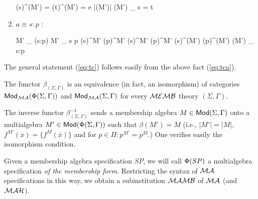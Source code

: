 \documentclass[10pt]{article}
\begin{document}
\begin{PROOF}
\begin{enumerate}
\begin{eqp}
			{\nu}(s)^{\beta(M')} = {\nu}(t)^{\beta(M')} = e \in |\beta(M')|
			{\beta(M')} \models_{\nu} s = t
		\end{eqp}
\item $a\equiv s:p$ :
		\begin{eqp}
			M' \models_{\nu} \alpha(s:p)
			M' \models_{\nu} s \prec p
			{\nu}(s)^{M'} \subseteq {\nu}(p)^{M'}
			{\nu}(s)^{M'} \in {\nu}(p)^{M'}
			{\nu}(s)^{\beta(M')} \in {\nu}(p)^{\beta(M')}
			{\beta(M')} \models_{\nu} s:p
		\end{eqp}
	\end{enumerate}
The general statement (\ref{eq:tc}) follows easily from the above fact (\ref{eq:tca}).
\end{PROOF}

\begin{fact}
The functor $\beta_{(\Sigma,\Gamma)}$ is an equivalence (in fact, an
isomorphism) of categories ${\sf {Mod}}_{{\mathcal{MA}}}({\sf {\Phi}}(\Sigma,\Gamma))$ and
${\sf {Mod}}_{{\mathcal{MA}}}(\Sigma,\Gamma)$ for
every ${\mathcal{MEMB}}$ theory $(\Sigma,\Gamma)$. 
\end{fact}
%
\begin{PROOF}
The inverse functor
$\beta^{-1}_{(\Sigma,\Gamma)}$ sends a membership algebra
$M\in{\sf {Mod}}(\Sigma,\Gamma)$ onto a multialgebra
$M'\in{\sf {Mod}}({\sf {\Phi}}(\Sigma,\Gamma))$ such that $\beta(M')=M$ (i.e., $|M'|=|M|$,
$f^{M'}(\overline x) = \{f^M(\overline x)\}$ and for $p\in\Pi:p^{M'}=p^M$.)
One verifies easily the isomorphism condition.
\end{PROOF}
%
Given a membership algebra specification $SP$, we will call ${\sf {\Phi}}(SP)$ a
multialgebra specification {\em of the membership form}. Restricting the syntax
of ${\mathcal{MA}}$ specifications in this way, we obtain a 
subinstitution ${\mathcal{MAMB}}$ of ${\mathcal{MA}}$ (and ${\mathcal{MAH}}$).
\end{document}
